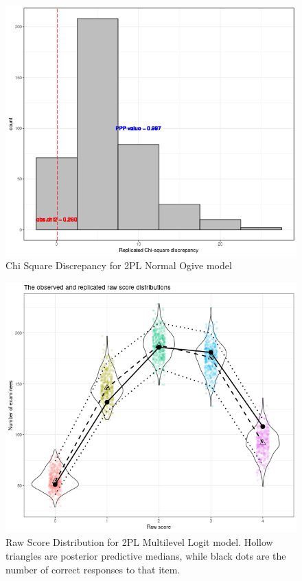 \documentclass[12pt]{article}
\begin{document}
\begin{figure}[h]
\vspace{-0.5cm}
  \centering
  \includegraphics[width=1\columnwidth]{Plots/Plots_2PL_Ogive/chi_square.png}
  \caption{Chi Square Discrepancy for 2PL Normal Ogive model}
  \label{2pl_ogive_chi_squar}
\end{figure}

\begin{figure}[h]
\vspace{-0.5cm}
  \centering
  \includegraphics[width=1\columnwidth]{Plots/Plots_2PL_mlirt_Logit/raw_score_dist.png}
  \caption{Raw Score Distribution for 2PL Multilevel Logit model. Hollow triangles are posterior predictive medians, while black dots are the number of correct responses to that item.}
  \label{2pl_logit_mlirt_raw_score}
\end{figure}
\end{document}
